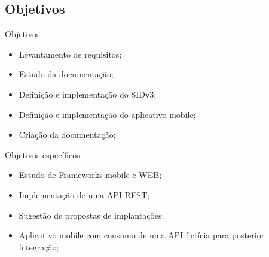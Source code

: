 \documentclass{aula-ifb}
\begin{document}
\subsection{Objetivos}
\begin{frame}{Objetivos}
	\begin{itemize}
   		\item Levantamento de requisitos;
   		\vspace{10px}
   		\item Estudo da documentação;
   		\vspace{10px}
   		\item Definição e implementação do SIDv3;
   		\vspace{10px}
   		\item Definição e implementação do aplicativo mobile;
   		\vspace{10px}
   		\item Criação da documentação;
	\end{itemize}
\end{frame}

\begin{frame}{Objetivos específicos}
	\begin{itemize}
   		\item Estudo de Frameworks mobile e WEB;
   		\vspace{10px}
   		\item Implementação de uma API REST;
   		\vspace{10px}
   		\item Sugestão de propostas de implantações;
   		\vspace{10px}
   		\item Aplicativo mobile com consumo de uma API fictícia para posterior integração;
	\end{itemize}
\end{frame}
\end{document}
